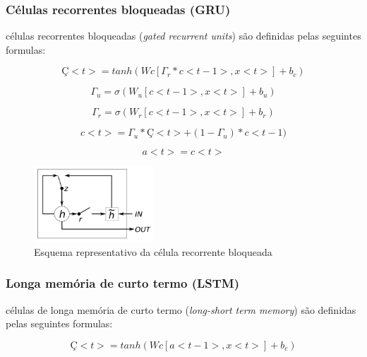 \documentclass[12pt]{article}
\begin{document}
\subsubsection{Células recorrentes bloqueadas (GRU)}

células recorrentes bloqueadas (\textit{gated recurrent units}) são definidas pelas seguintes formulas:

\begin{equation}
    Ç<t> = tanh(Wc[\Gamma_r * c<t-1>, x<t>]+b_c)
\end{equation}

\begin{equation}
    \Gamma_u = \sigma(W_u[c<t-1>, x<t>]+b_u)
\end{equation}

\begin{equation}
    \Gamma_r = \sigma(W_r[c<t-1>, x<t>]+b_r)
\end{equation}

\begin{equation}
    c<t>=\Gamma_u*Ç<t>+(1-\Gamma_u)*c<t-1)
\end{equation}

\begin{equation}
    a<t>=c<t>
\end{equation}


\begin{figure}[!htb]
\centering
\includegraphics[width=0.4\textwidth]{images/gru_gate.png}
\caption{Esquema representativo da célula recorrente bloqueada \cite{DBLP:journals/corr/ChungGCB14}}
\label{fig:gru_gaet}
\end{figure}

\subsubsection{Longa memória de curto termo (LSTM)}

células de longa memória de curto termo (\textit{long-short term memory}) são definidas pelas seguintes formulas:

\begin{equation}
    Ç<t> = tanh(Wc[a<t-1>, x<t>]+b_c)
\end{equation}
\end{document}

